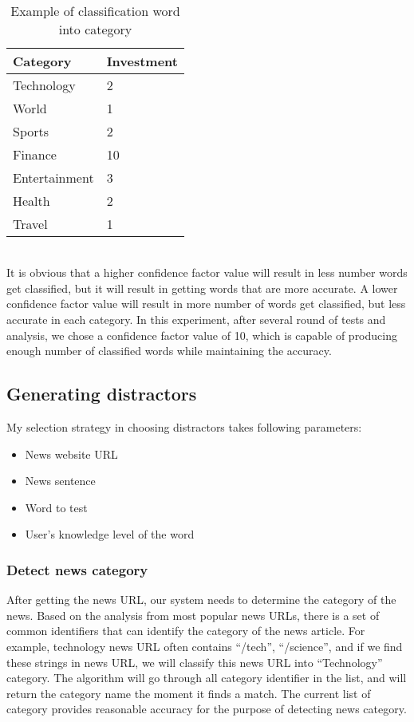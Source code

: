 \\
\begin{table}[ht]
    \caption{Example of classification word into category}
    \begin{center}
    \begin{tabular}{| p{3.5cm} | p{3cm} |}
        \hline
        Category & Investment\\
        \hline
        Technology & 2 \\
        \hline
        World & 1 \\
        \hline
        Sports & 2 \\
        \hline
        Finance & 10 \\
        \hline
        Entertainment & 3 \\
        \hline
        Health & 2 \\
        \hline
        Travel & 1\\
        \hline
    \end{tabular}
    \end{center}
\end{table}
\\
It is obvious that a higher confidence factor value will result in less number words get classified, but it will result in getting words that are more accurate. A lower confidence factor value will result in more number of words get classified, but less accurate in each category. In this experiment, after several round of tests and analysis, we chose a confidence factor value of 10, which is capable of producing enough number of classified words while maintaining the accuracy.
\subsection{Generating distractors}
My selection strategy in choosing distractors takes following parameters:
\begin{itemize}
\item News website URL
\item News sentence
\item Word to test
\item User’s knowledge level of the word
\end{itemize}
\subsubsection{Detect news category}
After getting the news URL, our system needs to determine the category of the news. Based on the analysis from most popular news URLs, there is a set of common identifiers that can identify the category of the news article. For example, technology news URL often contains “/tech”, “/science”, and if we find these strings in news URL, we will classify this news URL into “Technology” category. The algorithm will go through all category identifier in the list, and will return the category name the moment it finds a match. The current list of category provides reasonable accuracy for the purpose of detecting news category.
\\
